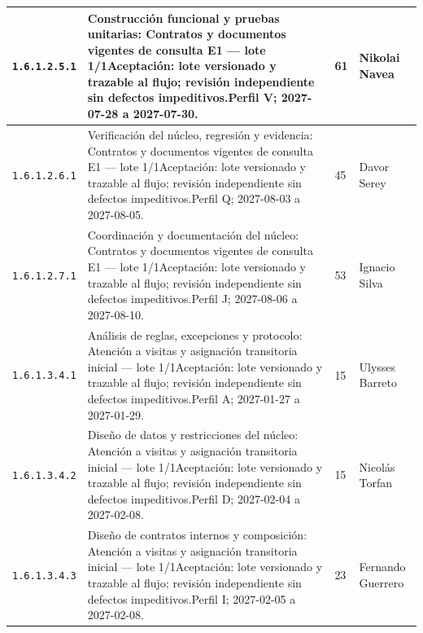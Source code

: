 \begin{longtable}{L{29mm}L{80mm}R{12mm}L{28mm}}
\texttt{1.\allowbreak{}6.\allowbreak{}1.\allowbreak{}2.\allowbreak{}5.\allowbreak{}1} & Construcción funcional y pruebas unitarias: Contratos y documentos vigentes de consulta E1 — lote 1/1\newline Aceptación: lote versionado y trazable al flujo; revisión independiente sin defectos impeditivos.\newline Perfil V; 2027-07-28 a 2027-07-30. & 61 & Nikolai Navea\\\hline
\texttt{1.\allowbreak{}6.\allowbreak{}1.\allowbreak{}2.\allowbreak{}6.\allowbreak{}1} & Verificación del núcleo, regresión y evidencia: Contratos y documentos vigentes de consulta E1 — lote 1/1\newline Aceptación: lote versionado y trazable al flujo; revisión independiente sin defectos impeditivos.\newline Perfil Q; 2027-08-03 a 2027-08-05. & 45 & Davor Serey\\\hline
\texttt{1.\allowbreak{}6.\allowbreak{}1.\allowbreak{}2.\allowbreak{}7.\allowbreak{}1} & Coordinación y documentación del núcleo: Contratos y documentos vigentes de consulta E1 — lote 1/1\newline Aceptación: lote versionado y trazable al flujo; revisión independiente sin defectos impeditivos.\newline Perfil J; 2027-08-06 a 2027-08-10. & 53 & Ignacio Silva\\\hline
\texttt{1.\allowbreak{}6.\allowbreak{}1.\allowbreak{}3.\allowbreak{}4.\allowbreak{}1} & Análisis de reglas, excepciones y protocolo: Atención a visitas y asignación transitoria inicial — lote 1/1\newline Aceptación: lote versionado y trazable al flujo; revisión independiente sin defectos impeditivos.\newline Perfil A; 2027-01-27 a 2027-01-29. & 15 & Ulysses Barreto\\\hline
\texttt{1.\allowbreak{}6.\allowbreak{}1.\allowbreak{}3.\allowbreak{}4.\allowbreak{}2} & Diseño de datos y restricciones del núcleo: Atención a visitas y asignación transitoria inicial — lote 1/1\newline Aceptación: lote versionado y trazable al flujo; revisión independiente sin defectos impeditivos.\newline Perfil D; 2027-02-04 a 2027-02-08. & 15 & Nicolás Torfan\\\hline
\texttt{1.\allowbreak{}6.\allowbreak{}1.\allowbreak{}3.\allowbreak{}4.\allowbreak{}3} & Diseño de contratos internos y composición: Atención a visitas y asignación transitoria inicial — lote 1/1\newline Aceptación: lote versionado y trazable al flujo; revisión independiente sin defectos impeditivos.\newline Perfil I; 2027-02-05 a 2027-02-08. & 23 & Fernando Guerrero\\\hline

\end{longtable}
